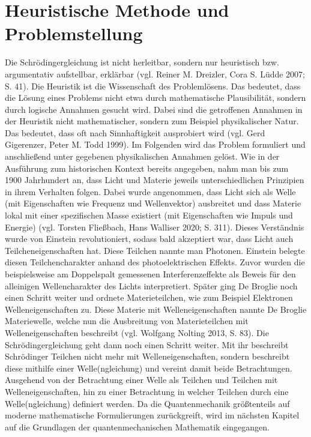 \documentclass[12pt,oneside, a4paper]{scrbook}
\begin{document}
\section{Heuristische Methode und Problemstellung}

Die Schrödingergleichung ist nicht herleitbar, sondern nur heuristisch bzw. argumentativ aufstellbar, erklärbar (vgl. Reiner M. Dreizler, Cora S. Lüdde 2007; S. 41). Die Heuristik ist die Wissenschaft des Problemlösens. Das bedeutet, dass die Lösung eines Problems nicht etwa durch mathematische Plausibilität, sondern durch logische Annahmen gesucht wird. Dabei sind die getroffenen Annahmen in der Heuristik nicht mathematischer, sondern zum Beispiel physikalischer Natur. Das bedeutet, dass oft nach Sinnhaftigkeit ausprobiert wird (vgl. Gerd Gigerenzer, Peter M. Todd 1999). Im Folgenden wird das Problem formuliert und anschließend unter gegebenen physikalischen Annahmen gelöst.
Wie in der Ausführung zum historischen Kontext bereits angegeben, nahm man bis zum 1900 Jahrhundert an, dass Licht und Materie jeweils unterschiedlichen Prinzipien in ihrem Verhalten folgen. Dabei wurde angenommen, dass Licht sich als Welle (mit Eigenschaften wie Frequenz und Wellenvektor) ausbreitet und dass Materie lokal mit einer spezifischen Masse existiert (mit Eigenschaften wie Impuls und Energie) (vgl. Torsten Fließbach, Hans Walliser 2020; S. 311).
Dieses Verständnis wurde von Einstein revolutioniert, sodass bald akzeptiert war, dass Licht auch Teilcheneigenschaften hat. Diese Teilchen nannte man Photonen. Einstein belegte diesen Teilchencharakter anhand des photoelektrischen Effekts. Zuvor wurden die beispielsweise am Doppelspalt gemessenen Interferenzeffekte als Beweis für den alleinigen Wellencharakter des Lichts interpretiert. 
Später ging De Broglie noch einen Schritt weiter und ordnete Materieteilchen, wie zum Beispiel Elektronen Welleneigenschaften zu.
Diese Materie mit Welleneigenschaften nannte De Broglie Materiewelle, welche nun die Ausbreitung von Materieteilchen mit Welleneigenschaften beschreibt (vgl. Wolfgang Nolting 2013, S. 83).
Die Schrödingergleichung geht dann noch einen Schritt weiter. Mit ihr beschreibt Schrödinger Teilchen nicht mehr mit Welleneigenschaften, sondern beschreibt diese mithilfe einer Welle(ngleichung) und vereint damit beide Betrachtungen. Ausgehend von der Betrachtung einer Welle als Teilchen und Teilchen mit Welleneigenschaften, hin zu einer Betrachtung in welcher Teilchen durch eine Welle(ngleichung) definiert werden.
Da die Quantenmechanik größtenteils auf moderne mathematische Formulierungen zurückgreift, wird im nächsten Kapitel auf die Grundlagen der quantenmechanischen Mathematik eingegangen.
\end{document}
